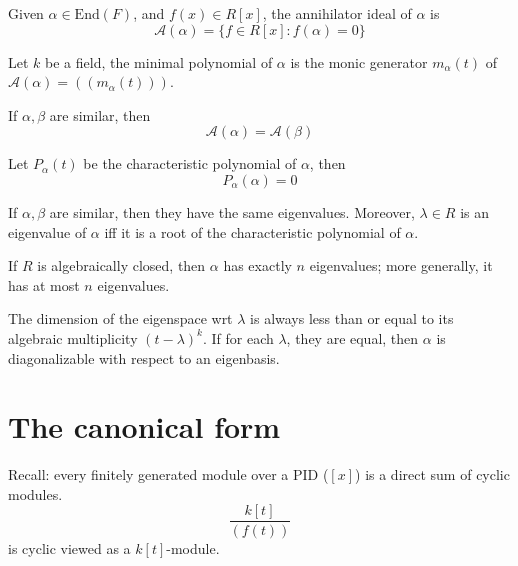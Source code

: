 \documentclass[openany]{book}
\begin{document}
\begin{defn}
    Given $\alpha\in\text{End}(F)$, and $f(x)\in R[x]$, the annihilator ideal of $\alpha$ is 
    \begin{equation*}
        \mathcal{A}(\alpha)=\{f\in R[x]: f(\alpha)=0\}
    \end{equation*}
\end{defn}

\begin{defn}
    Let $k$ be a field, the minimal polynomial of $\alpha$ is the monic generator $m_\alpha(t)$ of $\mathcal{A}(\alpha)=((m_\alpha(t)))$. 
\end{defn}

\begin{prop}
    If $\alpha,\beta$ are similar, then 
    \begin{equation*}
        \mathcal{A}(\alpha)=\mathcal{A}(\beta)
    \end{equation*}
\end{prop}

\begin{prop}
    Let $P_\alpha(t)$ be the characteristic polynomial of $\alpha$, then 
    \begin{equation*}
        P_\alpha(\alpha)=0
    \end{equation*}
\end{prop}

\begin{prop}
    If $\alpha,\beta$ are similar, then they have the same eigenvalues. Moreover, $\lambda\in R$ is an eigenvalue of $\alpha$ iff it is a root of the characteristic polynomial of $\alpha$.
\end{prop}

\begin{prop}
    If $R$ is algebraically closed, then $\alpha$ has exactly $n$ eigenvalues; more generally, it has at most $n$ eigenvalues.
\end{prop}

\begin{prop}
    The dimension of the eigenspace wrt $\lambda$ is always less than or equal to its algebraic multiplicity $(t-\lambda)^k$. If for each $\lambda$, they are equal, then $\alpha$ is diagonalizable with respect to an eigenbasis.
\end{prop}

\section{The canonical form}
\begin{prop}
    Recall: every finitely generated module over a PID ($[x]$) is a direct sum of cyclic modules. 
    \begin{equation*}
        \frac{k[t]}{(f(t))}
    \end{equation*}
    is cyclic viewed as a $k[t]$-module.
\end{prop}
\end{document}
